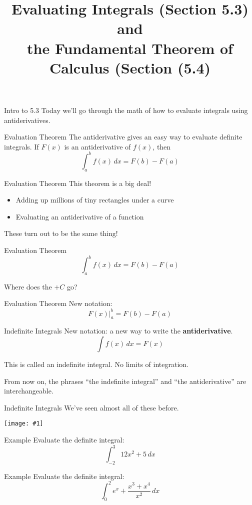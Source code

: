 \documentclass[t]{beamer}
\title{Evaluating Integrals (Section 5.3) and \\
the Fundamental Theorem of Calculus (Section (5.4)}
\date{}
\newcommand{\img}[1]{
\vfill
\begin{center}
\texttt{[image: \#1]}
\end{center}
\vfill
}
\begin{document}
\frame{\titlepage}

\begin{frame}{Intro to 5.3}
Today we'll go through the math of how to evaluate integrals using antiderivatives.
\end{frame}

\begin{frame}{Evaluation Theorem}
The antiderivative gives an easy way to evaluate definite integrals. If
$F(x)$ is an antiderivative of $f(x)$, then
$$\int_a^b f(x) \, dx = F(b) - F(a)$$
\end{frame}

\begin{frame}{Evaluation Theorem}
This  theorem is a big deal!
\begin{itemize}
\item Adding up millions of tiny rectangles under a curve
\item Evaluating an antiderivative of a function
\end{itemize}
These turn out to be the same thing!
\end{frame}

\begin{frame}{Evaluation Theorem}
$$\int_a^b f(x) \, dx = F(b) - F(a)$$

Where does the $+ C$ go?
\end{frame}

\begin{frame}{Evaluation Theorem}
New notation: 
$$F(x) |_a^b = F(b) - F(a)$$
\end{frame}

\begin{frame}{Indefinite Integrals}
New notation: a new way to write the \textbf{antiderivative}.
$$\int f(x) \, dx = F(x)$$

This is called an indefinite integral.  No limits of integration.

From now on, the phrases ``the indefinite integral'' and ``the antiderivative''
are interchangeable.
\end{frame}

\begin{frame}{Indefinite Integrals}
We've seen almost all of these before.
\img{indef}
\end{frame}

\begin{frame}{Example}
Evaluate the definite integral:
$$\int_{-2}^3 12 x^2 + 5 \, dx$$
\end{frame}

\begin{frame}{Example}
Evaluate the definite integral:
$$\int_0^2 e^x + \frac{x^3 + x^4}{x^2} \, dx $$
\end{frame}
\end{document}
